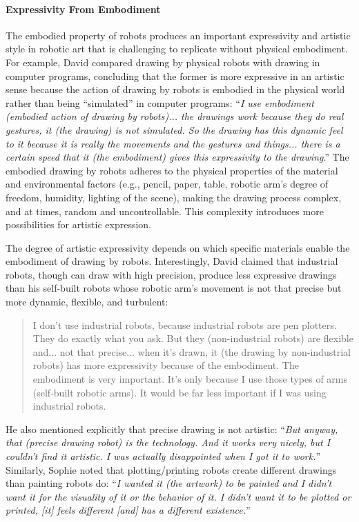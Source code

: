 \paragraph{Expressivity From Embodiment}
The embodied property of robots produces an important expressivity and artistic style in robotic art that is challenging to replicate without physical embodiment. For example, David compared drawing by physical robots with drawing in computer programs, concluding that the former is more expressive in an artistic sense because the action of drawing by robots is embodied in the physical world rather than being ``simulated'' in computer programs: ``\textit{I use embodiment (embodied action of drawing by robots)... the drawings work because they do real gestures, it (the drawing) is not simulated. So the drawing has this dynamic feel to it because it is really the movements and the gestures and things... there is a certain speed that it (the embodiment) gives this expressivity to the drawing}.'' The embodied drawing by robots adheres to the physical properties of the material and environmental factors (e.g., pencil, paper, table, robotic arm's degree of freedom, humidity, lighting of the scene), making the drawing process complex, and at times, random and uncontrollable. This complexity introduces more possibilities for artistic expression.

The degree of artistic expressivity depends on which specific materials enable the embodiment of drawing by robots. Interestingly, David claimed that industrial robots, though can draw with high precision, produce less expressive drawings than his self-built robots whose robotic arm's movement is not that precise but more dynamic, flexible, and turbulent:

\begin{quote}
    I don't use industrial robots, because industrial robots are pen plotters. They do exactly what you ask. But they (non-industrial robots) are flexible and... not that precise... when it's drawn, it (the drawing by non-industrial robots) has more expressivity because of the embodiment. The embodiment is very important. It's only because I use those types of arms (self-built robotic arms). It would be far less important if I was using industrial robots.
\end{quote}

He also mentioned explicitly that precise drawing is not artistic: ``\textit{But anyway, that (precise drawing robot) is the technology. And it works very nicely, but I couldn't find it artistic. I was actually disappointed when I got it to work.}'' Similarly, Sophie noted that plotting/printing robots create different drawings than painting robots do: ``\textit{I wanted it (the artwork) to be painted and I didn't want it for the visuality of it or the behavior of it. I didn't want it to be plotted or printed, [it] feels different [and] has a different existence.}''

